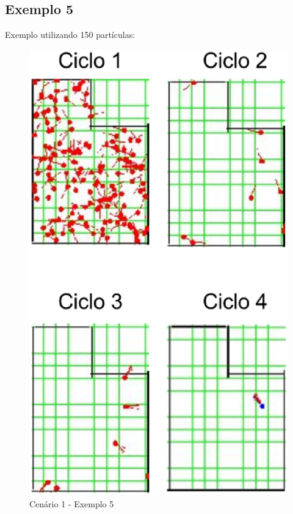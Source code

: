 \subsection{Exemplo 5}

Exemplo utilizando 150 partículas:

\begin{figure}[H]
  \centering
  \includegraphics[scale=0.5]{figuras/cen1_ex5}
  \caption[Cenário 1 - Exemplo 5]{Cenário 1 - Exemplo 5}
  \label{img:cen1_ex5}
\end{figure}

